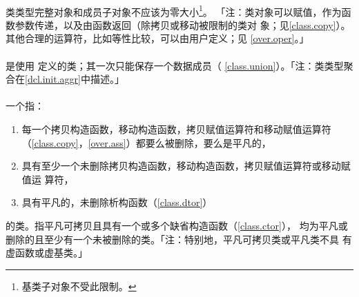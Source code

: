 \paragraph{}
类类型完整对象和成员子对象不应该为零大小\footnote{基类子对象不受此限制。}。
「注：类对象可以赋值，作为函数参数传递，以及由函数返回（除拷贝或移动被限制的类对
象；见\ref{class.copy}）。其他合理的运算符，比如等性比较，可以由用户定义；见
\ref{over.oper}。」

\paragraph{}
是使用 定义的类；其一次只能保存一个数据成员（
\ref{class.union}）。「注：类类型聚合在\ref{dcl.init.aggr}中描述。」

\paragraph{}
一个指：
\begin{enumerate}
  \item{每一个拷贝构造函数，移动构造函数，拷贝赋值运算符和移动赋值运算符
    （\ref{class.copy}，\ref{over.ass}）都要么被删除，要么是平凡的，}
  \item{具有至少一个未删除拷贝构造函数，移动构造函数，拷贝赋值运算符或移动赋值运
    算符，}
  \item{具有平凡的，未删除析构函数（\ref{class.dtor}）}
\end{enumerate}
的类。指平凡可拷贝且具有一个或多个缺省构造函数（\ref{class.ctor}），
均为平凡或删除的且至少有一个未被删除的类。「注：特别地，平凡可拷贝类或平凡类不具
有虚函数或虚基类。」

